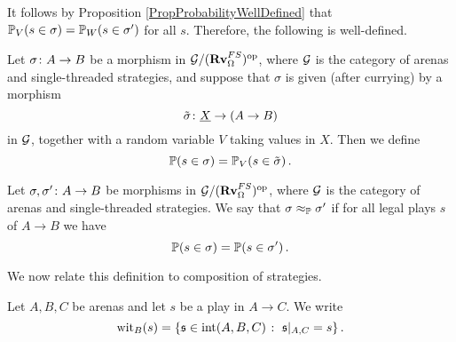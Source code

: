 \documentclass{report}[11pt]
\begin{document}
It follows by Proposition \ref{PropProbabilityWellDefined} that $\mathbb{P}_V(s\in\sigma)=\mathbb{P}_W(s\in\sigma')$ for all $s$.  
Therefore, the following is well-defined.

\begin{definition}
  Let $\sigma \colon A \to B$ be a morphism in $\mathcal G/({\normalfont\textbf{Rv}}_{\Omega}^{FS})^{\mathrm{op}}$, where $\mathcal G$ is the category of arenas and single-threaded strategies, and suppose that $\sigma$ is given (after currying) by a morphism
  \[
    \tilde\sigma \colon {\underline{X}} \to (A \to B)
    \]
  in $\mathcal G$, together with a random variable $V$ taking values in $X$.
  Then we define
  \[
    \mathbb{P}(s\in\sigma) = \mathbb{P}_V(s\in\tilde\sigma)\,.
    \]
\end{definition}

\begin{definition}
  Let $\sigma,\sigma'\colon A \to B$ be morphisms in $\mathcal G/({\normalfont\textbf{Rv}}_{\Omega}^{FS})^{\mathrm{op}}$, where $\mathcal G$ is the category of arenas and single-threaded strategies.  
  We say that $\sigma\approx_{\mathbb{P}}\sigma'$ if for all legal plays $s$ of $A \to B$ we have
  \[
    \mathbb{P}(s\in\sigma) = \mathbb{P}(s\in\sigma')\,.
    \]
\end{definition}

We now relate this definition to \Mellies composition of strategies.

\begin{definition}
  Let $A,B,C$ be arenas and let $s$ be a play in $A\to C$.  
  We write
  \[
    \operatorname{wit}_B(s) = \{\mathfrak s\in\operatorname{int}(A,B,C)\;\colon\; \mathfrak s\vert_{A,C}=s\}\,.
    \]
\end{definition}
\end{document}

